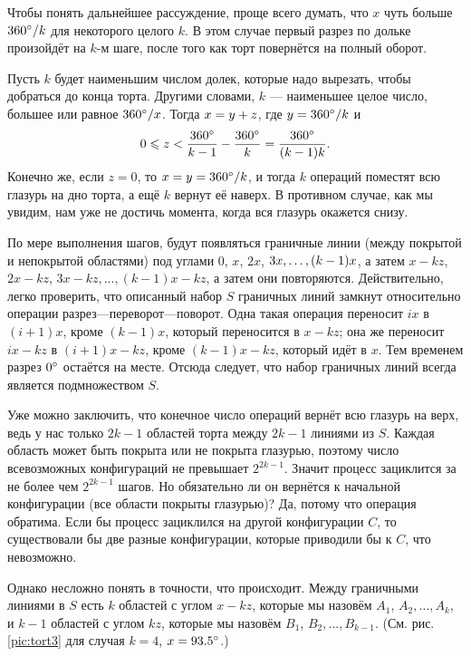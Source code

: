 Чтобы понять дальнейшее рассуждение, проще всего думать, что $x$ чуть больше $360\degree/k$ для некоторого целого $k$.
В этом случае первый разрез по дольке произойдёт на $k$-м шаге, после того как торт повернётся на полный оборот.

Пусть $k$ будет наименьшим числом долек, которые надо вырезать, чтобы добраться до конца торта.
Другими словами, $k$ --- наименьшее целое число, большее или равное $360\degree/x$.
Тогда $x \z= y + z$, где $y = 360\degree/k$ и 
\[0\leqslant z <\frac{360\degree}{k-1}-\frac{360\degree}{k}=\frac{360\degree}{(k-1)k}.\]
Конечно же, если $z = 0$, то $x = y = 360\degree/k$, и тогда $k$ операций поместят всю глазурь на дно торта, а ещё $k$ вернут её наверх.
В противном случае, как мы увидим, нам уже не достичь момента, когда вся глазурь окажется снизу.

По мере выполнения шагов, будут появляться граничные линии (между покрытой и непокрытой областями) под углами $0$, $x$, $2x$, $3x, \z\dots , (k - 1)x$, а затем $x - kz$, $2x - kz$, $3x - kz, \dots , (k - 1)x - kz$,
а затем они повторяются.
Действительно, легко проверить, что описанный набор $S$ граничных линий замкнут относительно операции разрез---переворот---поворот.
Одна такая операция переносит $ix$ в $(i + 1)x$, кроме $(k - 1)x$, который переносится в $x - kz$;
она же переносит $ix - kz$ в $(i + 1)x - kz$, кроме $(k - 1)x - kz$, который идёт в $x$.
Тем временем разрез $0\degree$ остаётся на месте.
Отсюда следует, что набор граничных линий всегда является подмножеством $S$.

Уже можно заключить, что конечное число операций вернёт всю глазурь на верх, ведь у нас только $2k - 1$ областей торта между $2k - 1$ линиями из $S$.
Каждая область может быть покрыта или не покрыта глазурью, поэтому число всевозможных конфигураций не превышает $2^{2k-1}$.
Значит процесс зациклится за не более чем $2^{2k-1}$ шагов.
Но обязательно ли он вернётся к начальной конфигурации (все области покрыты глазурью)?
Да, потому что операция обратима.
Если бы процесс зациклился на другой конфигурации $C$, то существовали бы две разные конфигурации, которые приводили бы к $C$, что невозможно.

Однако несложно понять в точности, что происходит.
Между граничными линиями в $S$ есть $k$ областей с углом $x - kz$, которые мы назовём $A_1$, $A_2, \dots , A_k$, и $k - 1$ областей с углом $kz$, которые мы назовём $B_1$, $B_2, \dots , B_{k-1}$.
(См. рис. \ref{pic:tort3} для случая $k = 4$, $x = 93.5\degree$.)

